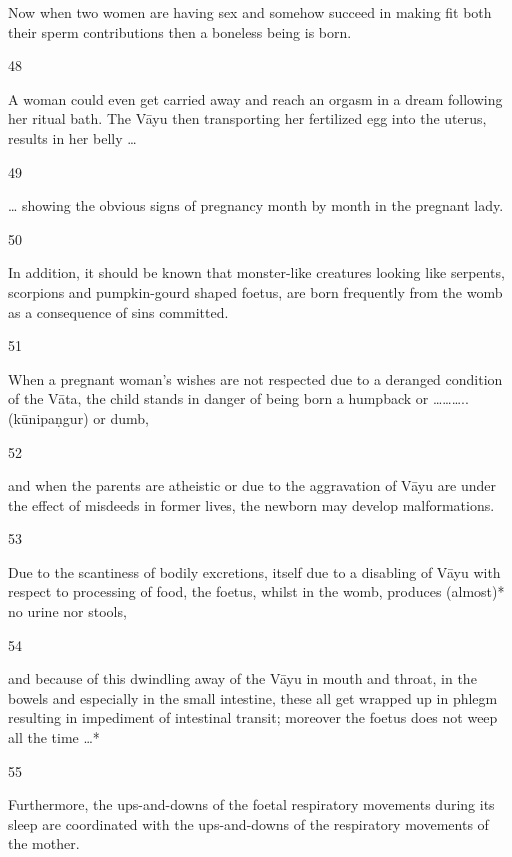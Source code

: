 \begin{translation}
\begin{tt}
 Now when two women are having sex and somehow succeed in making 
  fit both their sperm contributions then a boneless being is born.
  
\item[48]

A woman could even get carried away and reach an orgasm in a dream 
  following her ritual bath. The Vāyu then transporting her fertilized egg into the 
  uterus, results in her belly …
  
\item[49]

 … showing the obvious signs of pregnancy month by month in the 
  pregnant lady.
  
\item[50]

In addition, it should be known that monster-like creatures looking like 
  serpents, scorpions and pumpkin-gourd shaped foetus, are born frequently from 
  the womb as a consequence of sins committed.
  
\item[51]

When a pregnant woman’s wishes are not respected due to a deranged 
  condition of the Vāta, the child stands in danger of being born a humpback or 
  ……….. (kūnipaṇgur) or dumb,
  
\item[52]

and when the parents are atheistic or due to the aggravation of Vāyu are 
  under the effect of misdeeds in former lives, the newborn may develop 
  malformations.
  
\item[53]

 Due to the scantiness of bodily excretions, itself due to a disabling of 
  Vāyu with respect to processing of food, the foetus, whilst in the womb, 
  produces (almost)* no urine nor stools, 
  
\item[54]

 and because of this dwindling away of the Vāyu in mouth and throat, in 
  the bowels and especially in the small intestine, these all get wrapped up in 
  phlegm resulting in impediment of intestinal transit; moreover the foetus does 
  not weep all the time …*
  
\item[55]

Furthermore, the ups-and-downs of the foetal respiratory movements 
  during its sleep are coordinated with the ups-and-downs of the respiratory 
  movements of the mother.
  

\end{tt}
\end{translation}
